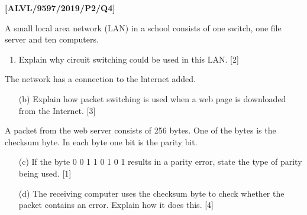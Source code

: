 \item \textbf{{[}ALVL/9597/2019/P2/Q4{]} }

A small local area network (LAN) in a school consists of one switch,
one file server and ten computers.
\begin{enumerate}
\item Explain why circuit switching could be used in this LAN. \hfill{}{[}2{]}
\end{enumerate}
The network has a connection to the lnternet added.
\begin{enumerate}
\item[(b)] Explain how packet switching is used when a web page is downloaded
from the Internet. \hfill{}{[}3{]}
\end{enumerate}
A packet from the web server consists of 256 bytes. One of the bytes
is the checksum byte. In each byte one bit is the parity bit.
\begin{enumerate}
\item[(c)]  If the byte 0 0 1 1 0 1 0 1 results in a parity error, state the
type of parity being used. \hfill{}{[}1{]}
\item[(d)]  The receiving computer uses the checksum byte to check whether the
packet contains an error. Explain how it does this.\hfill{} {[}4{]}
\end{enumerate}